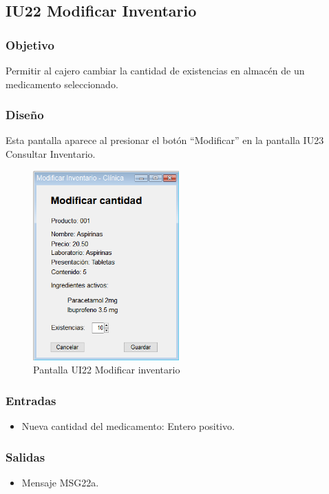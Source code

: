 \subsection{IU22 Modificar Inventario}

\subsubsection{Objetivo}
Permitir al cajero cambiar la cantidad de existencias en almacén de un medicamento seleccionado.

\subsubsection{Diseño}
Esta pantalla aparece al presionar el botón ``Modificar'' en la pantalla IU23 Consultar Inventario.

\begin{figure}[htbp!]
	\centering
	\includegraphics[width=0.5\textwidth]{images/gui/ui22_modificar_inventario}
	\caption{Pantalla UI22 Modificar inventario}
\end{figure}

\subsubsection{Entradas}
\begin{itemize}
	\item Nueva cantidad del medicamento: Entero positivo.
\end{itemize}

\subsubsection{Salidas}
\begin{itemize}
	\item Mensaje MSG22a.
\end{itemize}

